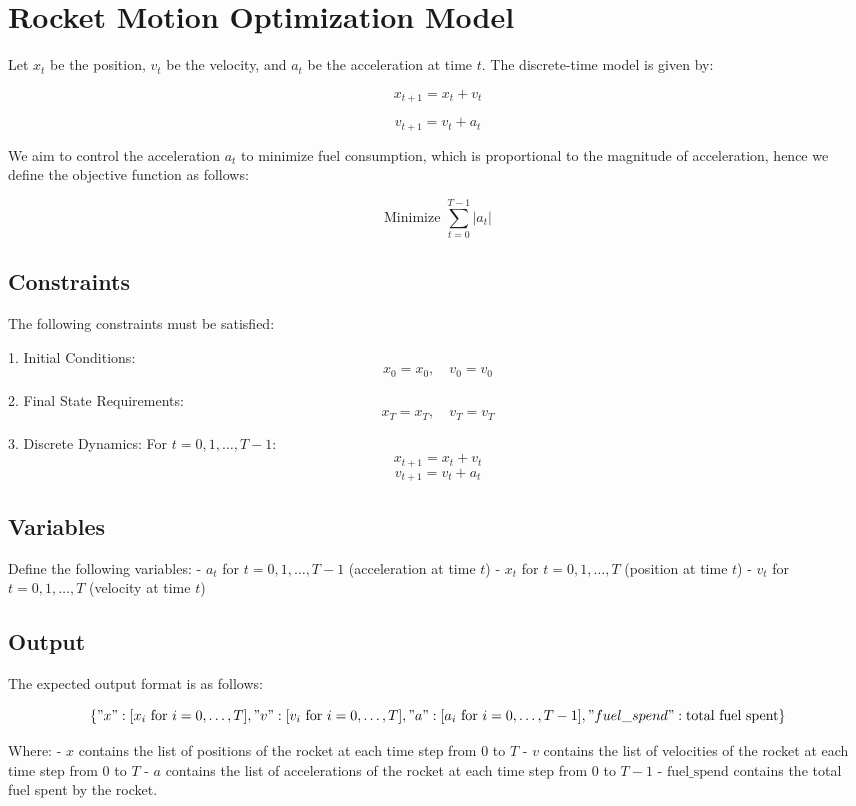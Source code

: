 \documentclass{article}
\begin{document}
\section*{Rocket Motion Optimization Model}

Let \( x_t \) be the position, \( v_t \) be the velocity, and \( a_t \) be the acceleration at time \( t \). The discrete-time model is given by:

\[
x_{t+1} = x_t + v_t
\]

\[
v_{t+1} = v_t + a_t
\]

We aim to control the acceleration \( a_t \) to minimize fuel consumption, which is proportional to the magnitude of acceleration, hence we define the objective function as follows:

\[
\text{Minimize } \sum_{t=0}^{T-1} |a_t|
\]

\subsection*{Constraints}

The following constraints must be satisfied:

1. Initial Conditions:
   \[
   x_0 = x_0, \quad v_0 = v_0
   \]

2. Final State Requirements:
   \[
   x_T = x_T, \quad v_T = v_T
   \]

3. Discrete Dynamics:
   For \( t = 0, 1, \ldots, T-1 \):
   \[
   x_{t+1} = x_t + v_t
   \]
   \[
   v_{t+1} = v_t + a_t
   \]

\subsection*{Variables}

Define the following variables:
- \( a_t \) for \( t = 0, 1, \ldots, T-1 \) (acceleration at time \( t \))
- \( x_t \) for \( t = 0, 1, \ldots, T \) (position at time \( t \))
- \( v_t \) for \( t = 0, 1, \ldots, T \) (velocity at time \( t \))

\subsection*{Output}

The expected output format is as follows:

\[
\{
    "x": [x_i \text{ for } i = 0, \ldots, T],
    "v": [v_i \text{ for } i = 0, \ldots, T],
    "a": [a_i \text{ for } i = 0, \ldots, T-1],
    "fuel\_spend": \text{total fuel spent}
\}
\]

Where:
- \( x \) contains the list of positions of the rocket at each time step from 0 to \( T \)
- \( v \) contains the list of velocities of the rocket at each time step from 0 to \( T \)
- \( a \) contains the list of accelerations of the rocket at each time step from 0 to \( T-1 \)
- \( \text{fuel\_spend} \) contains the total fuel spent by the rocket.
\end{document}
